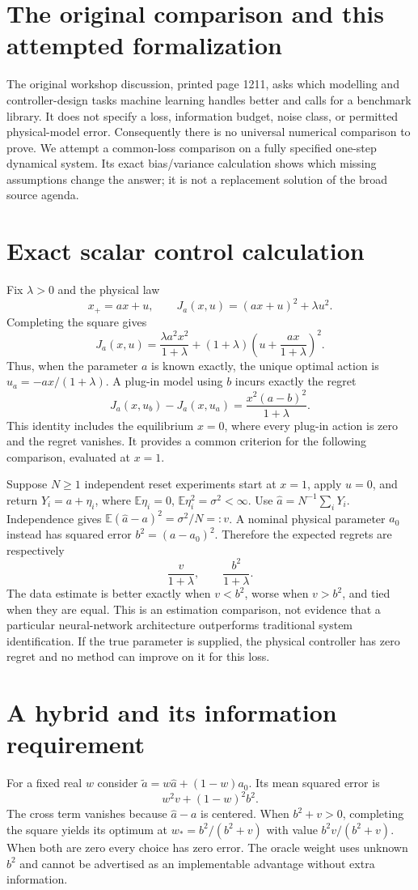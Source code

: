 \documentclass[11pt]{article}
\begin{document}
\section{The original comparison and this attempted formalization}
The original workshop discussion, printed page 1211, asks which
modelling and controller-design tasks machine learning handles
better and calls for a benchmark library. It does not specify a
loss, information budget, noise class, or permitted physical-model
error. Consequently there is no universal numerical comparison to
prove. We attempt a common-loss comparison on a fully specified
one-step dynamical system. Its exact bias/variance calculation
shows which missing assumptions change the answer; it is not a
replacement solution of the broad source agenda.

\section{Exact scalar control calculation}
Fix $\lambda>0$ and the physical law
\[
 x_+=a x+u,\qquad J_a(x,u)=(a x+u)^2+\lambda u^2.
\]
Completing the square gives
\[
 J_a(x,u)=\frac{\lambda a^2x^2}{1+\lambda}
 +(1+\lambda)\left(u+\frac{a x}{1+\lambda}\right)^2.
\]
Thus, when the parameter $a$ is known exactly, the unique optimal
action is $u_a=-a x/(1+\lambda)$. A plug-in model using $b$
incurs exactly the regret
\[
 J_a(x,u_b)-J_a(x,u_a)=\frac{x^2(a-b)^2}{1+\lambda}.
\]
This identity includes the equilibrium $x=0$, where every plug-in
action is zero and the regret vanishes. It provides a common
criterion for the following comparison, evaluated at $x=1$.

Suppose $N\ge1$ independent reset experiments start at $x=1$,
apply $u=0$, and return $Y_i=a+\eta_i$, where
$\mathbb E\eta_i=0$, $\mathbb E\eta_i^2=\sigma^2<\infty$.
Use $\widehat a=N^{-1}\sum_iY_i$. Independence gives
$\mathbb E(\widehat a-a)^2=\sigma^2/N=:v$. A nominal physical
parameter $a_0$ instead has squared error $b^2=(a-a_0)^2$.
Therefore the expected regrets are respectively
\[
 \frac{v}{1+\lambda},\qquad \frac{b^2}{1+\lambda}.
\]
The data estimate is better exactly when $v<b^2$, worse when
$v>b^2$, and tied when they are equal. This is an estimation
comparison, not evidence that a particular neural-network
architecture outperforms traditional system identification.
If the true parameter is supplied, the physical controller has
zero regret and no method can improve on it for this loss.

\section{A hybrid and its information requirement}
For a fixed real $w$ consider
$\widetilde a=w\widehat a+(1-w)a_0$. Its mean squared error is
\[
 w^2v+(1-w)^2b^2.
\]
The cross term vanishes because $\widehat a-a$ is centered.
When $b^2+v>0$, completing the square yields its optimum at
$w_*=b^2/(b^2+v)$ with value $b^2v/(b^2+v)$. When both
are zero every choice has zero error. The oracle weight uses
unknown $b^2$ and cannot be advertised as an implementable
advantage without extra information.
\end{document}
